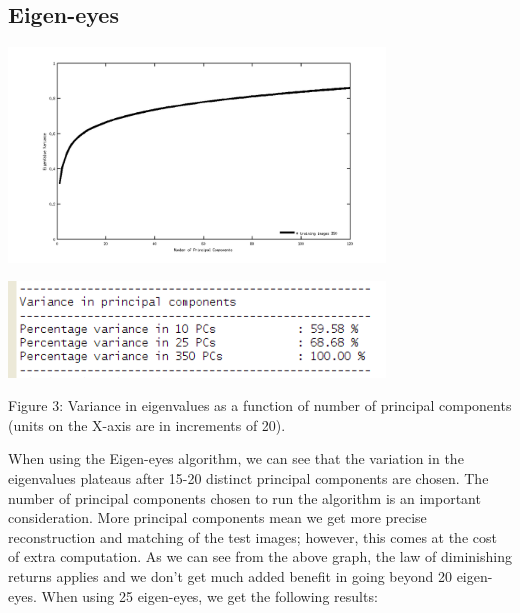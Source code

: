 \documentclass[12pt,letterpaper]{article}
\begin{document}
\begin{multicols}{2}
\subsection{Eigen-eyes}
\label{scn:results-eigeneyes}

\includegraphics[width=10cm]{eigenValueVariance.png}

\includegraphics[width=10cm]{eigenValueVariance2.png}

\small Figure 3: Variance in eigenvalues as a function of number of principal components
(units on the X-axis are in increments of 20).

\medskip
When using the Eigen-eyes algorithm, we can see that the variation in the eigenvalues plateaus after 
15-20 distinct principal components are chosen. The number of principal components chosen to run the 
algorithm is an important consideration. More principal components mean we get more precise reconstruction
and matching of the test images; however, this comes at the cost of extra computation. As we can see from
the above graph, the law of diminishing returns applies and we don't get much added benefit in going beyond
20 eigen-eyes.
\newpage
When using 25 eigen-eyes, we get the following results:

\end{multicols}
\end{document}
